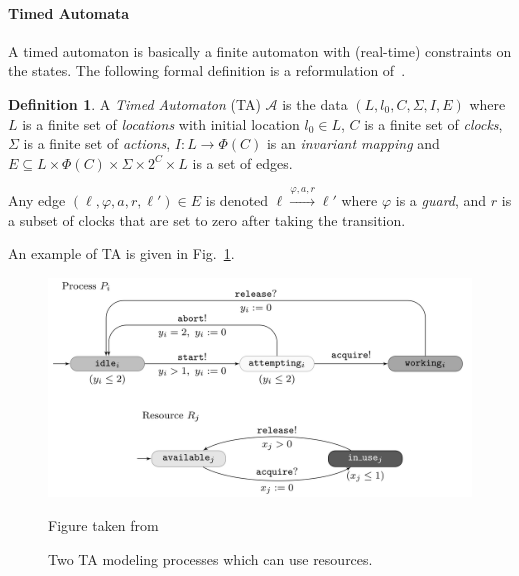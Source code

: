 \documentclass[11pt]{article}
\theoremstyle{definition}
\newtheorem{definition}{Definition}
\theoremstyle{remark}
\theoremstyle{definition}
\begin{document}
\paragraph{Timed Automata}\label{par:ta}
A timed automaton is basically a finite automaton with (real-time) constraints on the states.
The following formal definition is a reformulation of~\cite[Chapter 29.2, Definition 1]{handbook}.
\begin{definition}\label{def:ta}
	A \emph{Timed Automaton} (TA) $\mathcal{A}$ is the data $(L, l_0, C, \Sigma, I, E)$ where
	$L$ is a finite set of \emph{locations} with initial location $l_0 \in L$,
	$C$ is a finite set of \emph{clocks},
	$\Sigma$ is a finite set of \emph{actions},
	$I \colon L \to \Phi(C)$ is an \emph{invariant mapping} and
	$E \subseteq L \times \Phi(C) \times \Sigma \times 2^{C} \times L$ is a set of edges.

	Any edge $(\ell, \varphi, a, r, \ell') \in E$ is denoted $\ell \xrightarrow{\varphi, a, r} \ell'$ where $\varphi$ is a \emph{guard}, and $r$ is a subset of clocks that are set to zero after taking the transition.
\end{definition}
An example of TA is given in Fig.~\ref{fig:ta_ex}.

\begin{figure}[ht]
\centering
\includegraphics[width=.75\textwidth]{../img/TAex.png}
\caption{Two TA modeling processes which can use resources.}\label{fig:ta_ex}
\tiny{Figure taken from \cite[Chapter 29.2]{handbook}}
\end{figure}
\end{document}
